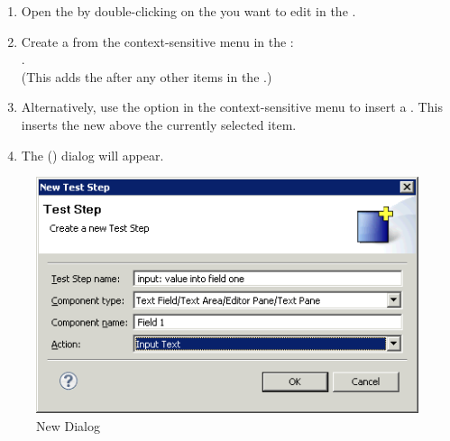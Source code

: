 
\begin{enumerate}
\item Open the \gdtestcaseeditor{} by double-clicking on the \gdcase{} you want to edit in the \gdtestcasebrowser{}. 
\item Create a \gdstep{} from the context-sensitive menu in the \gdtestcaseeditor{}:\\
 .\\
(This adds the \gdstep{} after any other items in the \gdtestcaseeditor{}.)

\item Alternatively, use the option in the context-sensitive menu to insert a \gdstep{}. This inserts the new \gdstep{} above the currently selected item.  
\item The  ()  dialog will appear.
\end{enumerate}

\begin{figure}
\begin{center}
\includegraphics{Tasks/Teststeps/PS/teststepdialog}
\caption{New \gdstep{} Dialog}
\label{newstep}
\end{center}
\end{figure}

